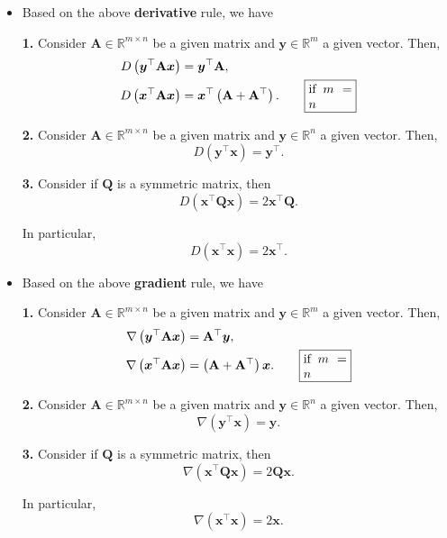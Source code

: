 \begin{itemize}
	\item Based on the above \textbf{derivative} rule, we have
	
	\textbf{1.} Consider \(\mathbf{A} \in \mathbb{R}^{m \times n}\) be a given matrix and \(\boldsymbol{y} \in \mathbb{R}^{m}\) a given vector. Then,
	\begin{align*}
		D\left(\boldsymbol{y}^{\top} \mathbf{A} \boldsymbol{x}\right) &=
		\boldsymbol{y}^{\top} \mathbf{A}, \\
		D\left(\boldsymbol{x}^{\top} \mathbf{A} \boldsymbol{x}\right) &=
		\boldsymbol{x}^{\top}\left(\mathbf{A}+\mathbf{A}^{\top}\right).  \qquad
		\fbox{\parbox{0.1\textwidth}{ if \(m=n\) }}
	\end{align*}
	
	
	\textbf{2.} Consider \(\mathbf{A} \in \mathbb{R}^{m \times n}\) be a given matrix and \(\boldsymbol{y} \in \mathbb{R}^{n}\) a given vector. Then,
	\[ D\left(\boldsymbol{y}^{\top} \boldsymbol{x}\right)=\boldsymbol{y}^{\top}. \]
	
	\textbf{3.} Consider if \(\mathbf{Q}\) is a symmetric matrix, then
	\[
	D\left(\boldsymbol{x}^{\top} \mathbf{Q} \boldsymbol{x}\right)=2 \boldsymbol{x}^{\top} \mathbf{Q}.
	\]
	
	In particular,
	\[
	D\left(\boldsymbol{x}^{\top} \boldsymbol{x}\right)=2 \boldsymbol{x}^{\top}.
	\]
	
	\item Based on the above \textbf{gradient} rule, we have
	
	\textbf{1.} Consider \(\mathbf{A} \in \mathbb{R}^{m \times n}\) be a given matrix and \(\boldsymbol{y} \in \mathbb{R}^{m}\) a given vector. Then,
	\begin{align*}
		\nabla \left(\boldsymbol{y}^{\top} \mathbf{A} \boldsymbol{x}\right) &= \mathbf{A}^{\top} \boldsymbol{y}, \\
		\nabla  \left(\boldsymbol{x}^{\top} \mathbf{A} \boldsymbol{x}\right) &=
		\left(\mathbf{A}+\mathbf{A}^{\top}\right) \boldsymbol{x}.  \qquad
		\fbox{\parbox{0.1\textwidth}{ if \(m=n\) }}
	\end{align*}
	
	
	\textbf{2.} Consider \(\mathbf{A} \in \mathbb{R}^{m \times n}\) be a given matrix and \(\boldsymbol{y} \in \mathbb{R}^{n}\) a given vector. Then,
	\[ \nabla \left(\boldsymbol{y}^{\top} \boldsymbol{x}\right)=\boldsymbol{y}. \]
	
	\textbf{3.} Consider if \(\mathbf{Q}\) is a symmetric matrix, then
	\[
	\nabla \left(\boldsymbol{x}^{\top} \mathbf{Q} \boldsymbol{x}\right)=2  \mathbf{Q} \boldsymbol{x}.
	\]
	
	In particular,
	\[
	\nabla \left(\boldsymbol{x}^{\top} \boldsymbol{x}\right)=2 \boldsymbol{x}.
	\]
	
\end{itemize}

